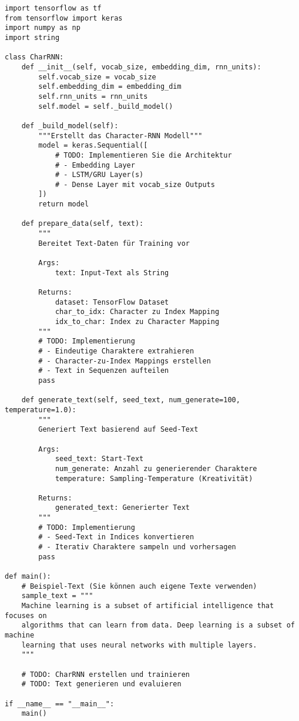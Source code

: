 \documentclass[12pt,a4paper]{article}
\begin{document}
\begin{lstlisting}[caption=Text-Generierung mit RNN]
import tensorflow as tf
from tensorflow import keras
import numpy as np
import string

class CharRNN:
    def __init__(self, vocab_size, embedding_dim, rnn_units):
        self.vocab_size = vocab_size
        self.embedding_dim = embedding_dim
        self.rnn_units = rnn_units
        self.model = self._build_model()
    
    def _build_model(self):
        """Erstellt das Character-RNN Modell"""
        model = keras.Sequential([
            # TODO: Implementieren Sie die Architektur
            # - Embedding Layer
            # - LSTM/GRU Layer(s)
            # - Dense Layer mit vocab_size Outputs
        ])
        return model
    
    def prepare_data(self, text):
        """
        Bereitet Text-Daten für Training vor
        
        Args:
            text: Input-Text als String
        
        Returns:
            dataset: TensorFlow Dataset
            char_to_idx: Character zu Index Mapping
            idx_to_char: Index zu Character Mapping
        """
        # TODO: Implementierung
        # - Eindeutige Charaktere extrahieren
        # - Character-zu-Index Mappings erstellen
        # - Text in Sequenzen aufteilen
        pass
    
    def generate_text(self, seed_text, num_generate=100, temperature=1.0):
        """
        Generiert Text basierend auf Seed-Text
        
        Args:
            seed_text: Start-Text
            num_generate: Anzahl zu generierender Charaktere
            temperature: Sampling-Temperature (Kreativität)
        
        Returns:
            generated_text: Generierter Text
        """
        # TODO: Implementierung
        # - Seed-Text in Indices konvertieren
        # - Iterativ Charaktere sampeln und vorhersagen
        pass

def main():
    # Beispiel-Text (Sie können auch eigene Texte verwenden)
    sample_text = """
    Machine learning is a subset of artificial intelligence that focuses on 
    algorithms that can learn from data. Deep learning is a subset of machine 
    learning that uses neural networks with multiple layers.
    """
    
    # TODO: CharRNN erstellen und trainieren
    # TODO: Text generieren und evaluieren

if __name__ == "__main__":
    main()
\end{lstlisting}
\end{document}
